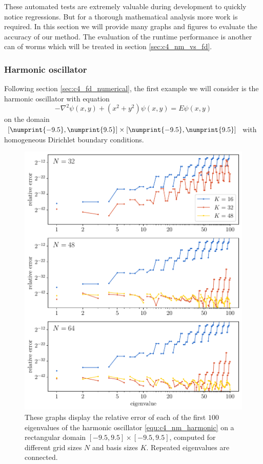 These automated tests are extremely valuable during development to quickly notice regressions. But for a thorough mathematical analysis more work is required. In this section we will provide many graphs and figures to evaluate the accuracy of our method. The evaluation of the runtime performance is another can of worms which will be treated in section \ref{sec:c4_nm_vs_fd}.

\subsubsection{Harmonic oscillator}\label{sec:c4_numerical_harmonic}

Following section \ref{sec:c4_fd_numerical}, the first example we will consider is the harmonic oscillator with equation
\begin{equation}\label{equ:c4_nm_harmonic}
    -\nabla^2 \psi(x, y) + \left(x^2 + y^2\right) \psi(x, y) = E \psi(x, y)
\end{equation}
on the domain $[\numprint{-9.5}, \numprint{9.5}] \times [\numprint{-9.5}, \numprint{9.5}]$ with homogeneous Dirichlet boundary conditions.

\begin{figure}
    \begin{center}
        \includegraphics[width=\textwidth]{img/chapter4/nm_test_harmonic.pdf}
    \end{center}
    \caption{These graphs display the relative error of each of the first $100$ eigenvalues of the harmonic oscillator \eqref{equ:c4_nm_harmonic} on a rectangular domain $[-9.5,9.5]\times[-9.5, 9.5]$, computed for different grid sizes $N$ and basis sizes $K$. Repeated eigenvalues are connected.}
    \label{fig:c4_nm_harmonic_rectangle}
\end{figure}

